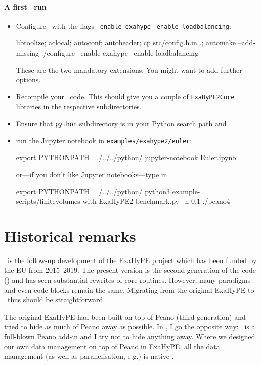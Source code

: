 \begin{framed}
\paragraph*{A first \ExaHyPE\ run}
\begin{itemize}
  \item Configure \Peano\ with the flags \texttt{--enable-exahype}
  \texttt{--enable-loadbalancing}:
  \begin{code}
libtoolize; aclocal; autoconf; autoheader; cp src/config.h.in .; automake --add-missing
./configure --enable-exahype --enable-loadbalancing
  \end{code}
   These are the two mandatory extensions. You might want to add further options.
  \item Recompile your \Peano\ code. This should give you a couple of
  \texttt{ExaHyPE2Core} libraries in the respective subdirectories.
  \item Ensure that \texttt{python} subdirectory is in your Python search path
  and
  \item run the Jupyter notebook in \texttt{examples/exahype2/euler}: 
  \begin{code}
export PYTHONPATH=../../../python/
jupyter-notebook Euler.ipynb
  \end{code}
  \noindent
  or---if you don't like Jupyter notebooks---type in
  \begin{code}
export PYTHONPATH=../../../python/
python3 example-scripts/finitevolumes-with-ExaHyPE2-benchmark.py --h 0.1
./peano4
  \end{code}
\end{itemize}
\end{framed}



\section{Historical remarks}

\ExaHyPE\ is the follow-up development of the ExaHyPE project which has
been funded by the EU from 2015--2019.
The present version is the second generation of the code (\ExaHyPE) and has
seen substantial rewrites of core routines.
However, many paradigms and even code blocks remain the same.
Migrating from the original ExaHyPE to \ExaHyPE\ thus should be straightforward.


The original ExaHyPE had been built on top of Peano (third generation) and tried
to hide as much of Peano away as possible.
In \ExaHyPE, I go the opposite way: \ExaHyPE\ is a full-blown Peano add-in and I
try not to hide anything away.
Where we designed our own data management on top of Peano in ExaHyPE, all the
data management (as well as parallelisation, e.g.) is native \Peano.


